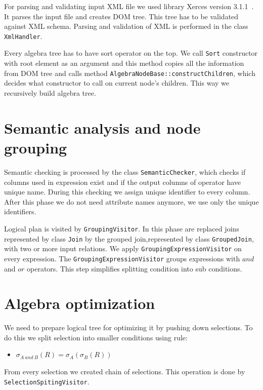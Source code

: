 For parsing and validating input XML file we used library Xerces version 3.1.1~\cite{xerces}. It parses the input file and creates DOM tree. This tree has to be validated against XML schema. Parsing and validation of XML is performed in the class \texttt{XmlHandler}.

Every algebra tree has to have sort operator on the top. We call \texttt{Sort} constructor with root element as an argument and this method copies all the information from DOM tree and calls method \texttt{AlgebraNodeBase::constructChildren}, which decides what constructor to call on current node's children. This way we recursively build algebra tree.



\section{Semantic analysis and node grouping}

Semantic checking is processed by the class \texttt{SemanticChecker}, which checks if columns used in expression exist and if the output columns of operator have unique name. During this checking we assign unique identifier to every column. After this phase we do not need attribute names anymore, we use only the unique identifiers.

Logical plan is visited by \texttt{GroupingVisitor}. In this phase are replaced joins represented by class \texttt{Join} by the grouped join,represented by class \texttt{GroupedJoin}, with two or more input relations. We apply \texttt{GroupingExpressionVisitor} on every expression. The \texttt{GroupingExpressionVisitor} groups expressions with $and$ and $or$ operators. This step simplifies splitting condition into sub conditions.

\section{Algebra optimization}

We need to prepare logical tree for optimizing it by pushing down selections. To do this we split selection into smaller conditions using rule:
\begin{itemize}
\item $\sigma_{A~and~B}(R)=\sigma_{A}(\sigma_{B}(R))$
\end{itemize}
From every selection we created chain of selections. This operation is done by \texttt{SelectionSpitingVisitor}.

